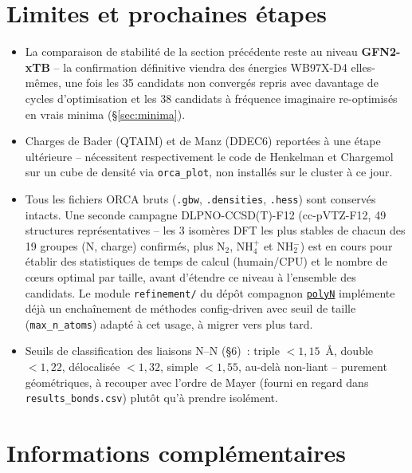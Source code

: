 \documentclass[11pt,a4paper]{article}
\begin{document}
\section{Limites et prochaines \'etapes}
\label{sec:limites}

\begin{itemize}[leftmargin=1.4em]
  \item La comparaison de stabilit\'e de la section pr\'ec\'edente reste
  au niveau \textbf{GFN2-xTB} -- la confirmation d\'efinitive viendra des
  \'energies WB97X-D4 elles-m\^emes, une fois les 35 candidats non
  convergés repris avec davantage de cycles d'optimisation et les 38
  candidats \`a fr\'equence imaginaire re-optimis\'es en vrais minima
  (\S\ref{sec:minima}).
  \item Charges de Bader (QTAIM) et de Manz (DDEC6) report\'ees \`a une
  \'etape ult\'erieure -- n\'ecessitent respectivement le code de
  Henkelman et Chargemol sur un cube de densit\'e via \texttt{orca\_plot},
  non install\'es sur le cluster \`a ce jour.
  \item Tous les fichiers ORCA bruts (\texttt{.gbw}, \texttt{.densities},
  \texttt{.hess}) sont conserv\'es intacts. Une seconde campagne
  DLPNO-CCSD(T)-F12 (cc-pVTZ-F12, 49 structures repr\'esentatives -- les 3
  isom\`eres DFT les plus stables de chacun des 19 groupes (N, charge)
  confirm\'es, plus N$_2$, NH$_4^+$ et NH$_2^-$) est en cours pour \'etablir
  des statistiques de temps de calcul (humain/CPU) et le nombre de c\oe urs
  optimal par taille, avant d'\'etendre ce niveau \`a l'ensemble des
  candidats. Le module \texttt{refinement/} du d\'ep\^ot compagnon
  \href{https://github.com/John-Akapulco/polyN}{\texttt{polyN}} impl\'emente
  d\'ej\`a un enchaînement de m\'ethodes config-driven avec seuil de taille
  (\texttt{max\_n\_atoms}) adapt\'e \`a cet usage, \`a migrer vers plus tard.
  \item Seuils de classification des liaisons N--N (\S6)~: triple
  $<1{,}15$~\AA, double $<1{,}22$, d\'elocalis\'ee $<1{,}32$, simple
  $<1{,}55$, au-del\`a non-liant -- purement g\'eom\'etriques, \`a
  recouper avec l'ordre de Mayer (fourni en regard dans
  \texttt{results\_bonds.csv}) plut\^ot qu'\`a prendre isol\'ement.
\end{itemize}

\clearpage
\appendix
\renewcommand{\thesection}{\Alph{section}}
\section{Informations compl\'ementaires}
\end{document}
